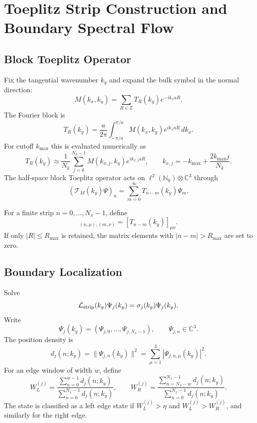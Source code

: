 \documentclass[11pt]{article}
\numberwithin{equation}{section}
\begin{document}
\section{Toeplitz Strip Construction and Boundary Spectral Flow}

\subsection{Block Toeplitz Operator}

Fix the tangential wavenumber $k_y$ and expand the bulk symbol in the
normal direction:
\begin{equation}
  M(k_x,k_y)=\sum_{R\in\mathbb Z}T_R(k_y)e^{-ik_xaR}.
\end{equation}
The Fourier block is
\begin{equation}
  T_R(k_y)=
  \frac{a}{2\pi}\int_{-\pi/a}^{\pi/a}
  M(k_x,k_y)e^{ik_xaR}\,dk_x .
\end{equation}
For cutoff $k_{\max}$ this is evaluated numerically as
\begin{equation}
  T_R(k_y)\approx\frac{1}{N_k}
  \sum_{j=0}^{N_k-1}M(k_{x,j},k_y)e^{ik_{x,j}aR},
  \qquad
  k_{x,j}=-k_{\max}+\frac{2k_{\max}j}{N_k}.
\end{equation}
The half-space block Toeplitz operator acts on
$\ell^2(\mathbb N_0)\otimes\mathbb C^3$ through
\begin{equation}
  (\mathcal T_M(k_y)\Psi)_n=
  \sum_{m=0}^\infty T_{n-m}(k_y)\Psi_m .
\end{equation}

For a finite strip $n=0,\ldots,N_x-1$, define
\begin{equation}
  [\mathcal L_{\rm strip}(k_y)]_{(n,\mu),(m,\nu)}
  =[T_{n-m}(k_y)]_{\mu\nu}.
  \label{eq:strip_matrix_appendix}
\end{equation}
If only $|R|\le R_{\max}$ is retained, the matrix elements with
$|n-m|>R_{\max}$ are set to zero.

\subsection{Boundary Localization}

Solve
\begin{equation}
  \mathcal L_{\rm strip}(k_y)\Psi_j(k_y)
  =\sigma_j(k_y)\Psi_j(k_y).
\end{equation}
Write
\begin{equation}
  \Psi_j(k_y)=(\Psi_{j,0},\ldots,\Psi_{j,N_x-1}),
  \qquad \Psi_{j,n}\in\mathbb C^3.
\end{equation}
The position density is
\begin{equation}
  d_j(n;k_y)=\|\Psi_{j,n}(k_y)\|^2
  =\sum_{\mu=1}^3|\Psi_{j,n,\mu}(k_y)|^2.
\end{equation}
For an edge window of width $w$, define
\begin{equation}
  W_L^{(j)}=
  \frac{\sum_{n=0}^{w-1}d_j(n;k_y)}
       {\sum_{n=0}^{N_x-1}d_j(n;k_y)},
  \qquad
  W_R^{(j)}=
  \frac{\sum_{n=N_x-w}^{N_x-1}d_j(n;k_y)}
       {\sum_{n=0}^{N_x-1}d_j(n;k_y)}.
\end{equation}
The state is classified as a left edge state if
$W_L^{(j)}>\eta$ and $W_L^{(j)}>W_R^{(j)}$, and similarly for the right
edge.
\end{document}
